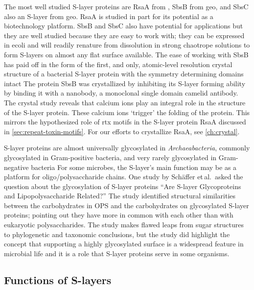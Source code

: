 The most well studied \ac{S-layer} proteins are RsaA from \caulobacter{}, SbsB from \acl{geo}, and SbsC also an \ac{S-layer} from \ac{geo}. RsaA is studied in part for its
potential as a biotechnology platform. SbsB and SbsC also have potential for applications but they are well studied because they are easy to work with; they can be expressed in
\acl{ecoli} and will readily renature from dissolution in strong chaotrope solutions to form \acp{S-layer} on almost any flat surface available. The ease of working with SbsB has
paid off in the form of the first, and only, atomic-level resolution crystal structure of a bacterial \ac{S-layer} protein with the symmetry determining domains
intact The protein SbsB was crystallized by inhibiting its \ac{S-layer} forming ability by binding it with a nanobody, a monoclonal single domain
camelid antibody. The crystal study reveals that calcium ions play an integral role in the structure of the \ac{S-layer} protein. These calcium ions `trigger' the folding of the
protein. This mirrors the hypothesized role of \ac{rtx} motifs in the \caulobacter{} \ac{S-layer} protein RsaA discussed in \cref{sec:repeat-toxin-motifs}. For our efforts to
crystallize RsaA, see \cref{ch:crystal}.
 
\ac{S-layer} proteins are almost universally glycosylated in \textit{Archaeabacteria}, commonly glycosylated in Gram-positive bacteria, and very rarely glycosylated in
Gram-negative bacteria For some microbes, the \ac{S-layer}'s main function may be as a platform for oligo/polysaccharide chains. One
study by Sch\"{a}ffer et\,al.~asked the question about the glycosylation of \ac{S-layer} proteins ``Are \ac{S-layer} Glycoproteins and Lipopolysaccharide
Related?'' The study identified structural similarities between the carbohydrates in \ac{OPS} and the carbohydrates on glycosylated \ac{S-layer} proteins;
pointing out they have more in common with each other than with eukaryotic polysaccharides. The study makes flawed leaps from sugar structures to phylogenetic and taxonomic
conclusions, but the study did highlight the concept that supporting a highly glycosylated surface is a widespread feature in microbial life and it is a role that \ac{S-layer}
proteins serve in some organisms. %

  \subsection{Functions of S-layers}
  \label{sec:intro-slayersfunction}


